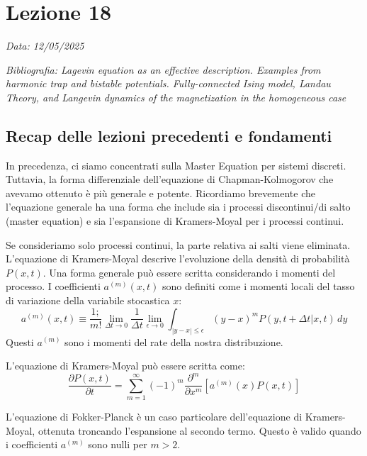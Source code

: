 \chapter{Lezione 18}
\label{chap:lezione_18} %

\begin{flushright}
\textit{Data: 12/05/2025}
\end{flushright}
\textit{Bibliografia: 
Lagevin equation as an effective description. Examples from harmonic trap and bistable potentials. Fully-connected Ising model, Landau Theory, and Langevin dynamics of the magnetization in the homogeneous case}

\section*{Recap delle lezioni precedenti e fondamenti}

In precedenza, ci siamo concentrati sulla Master Equation per sistemi discreti. Tuttavia, la forma differenziale dell'equazione di Chapman-Kolmogorov che avevamo ottenuto è più generale e potente. Ricordiamo brevemente che l'equazione generale ha una forma che include sia i processi discontinui/di salto (master equation) e sia l'espansione di Kramers-Moyal per i processi continui.

Se consideriamo solo processi continui, la parte relativa ai salti viene eliminata. L'equazione di Kramers-Moyal descrive l'evoluzione della densità di probabilità $P(x,t)$. Una forma generale può essere scritta considerando i momenti del processo. I coefficienti $a^{(m)}(x,t)$ sono definiti come i momenti locali del tasso di variazione della variabile stocastica $x$:
\begin{equation}
a^{(m)}(x,t) \equiv \frac{1;}{m!} \lim_{\Delta t\rightarrow0} \frac{1}{\Delta t} \lim_{\epsilon\rightarrow0} \int_{|y-x|\le\epsilon} (y-x)^{m} P(y,t+\Delta t|x,t) \, dy
\end{equation}
Questi $a^{(m)}$ sono i momenti del rate della nostra distribuzione.

L'equazione di Kramers-Moyal può essere scritta come:
\begin{equation}
\frac{\partial P(x,t)}{\partial t} = \sum_{m=1}^{\infty} (-1)^{m} \frac{\partial^m}{\partial x^m} [a^{(m)}(x)P(x,t)]
\end{equation}

L'equazione di Fokker-Planck è un caso particolare dell'equazione di Kramers-Moyal, ottenuta troncando l'espansione al secondo termo. Questo è valido quando i coefficienti $a^{(m)}$ sono nulli per $m > 2$.

